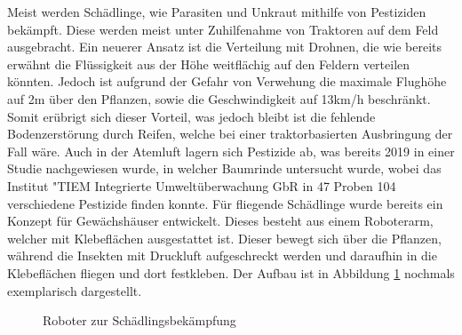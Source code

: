 Meist werden Schädlinge, wie Parasiten und Unkraut mithilfe von Pestiziden
bekämpft. Diese werden meist unter Zuhilfenahme von Traktoren auf dem Feld
ausgebracht. Ein neuerer Ansatz ist die Verteilung mit Drohnen, die wie bereits
erwähnt die Flüssigkeit aus der Höhe weitflächig auf den Feldern verteilen
könnten. Jedoch ist aufgrund der Gefahr von Verwehung die maximale Flughöhe auf
2m über den Pflanzen, sowie die Geschwindigkeit auf 13km/h
beschränkt.\cite{bvl} Somit erübrigt sich dieser Vorteil, was jedoch bleibt ist
die fehlende Bodenzerstörung durch Reifen, welche bei einer traktorbasierten
Ausbringung der Fall wäre. Auch in der Atemluft lagern sich Pestizide ab, was
bereits 2019 in einer Studie nachgewiesen wurde, in welcher Baumrinde
untersucht wurde, wobei das Institut "TIEM Integrierte Umweltüberwachung GbR in
47 Proben 104 verschiedene Pestizide finden
konnte.\cite{clausing2020baumrinden} Für fliegende Schädlinge wurde bereits ein
Konzept für Gewächshäuser entwickelt. Dieses besteht aus einem Roboterarm,
welcher mit Klebeflächen ausgestattet ist. Dieser bewegt sich über die
Pflanzen, während die Insekten mit Druckluft aufgeschreckt werden und daraufhin
in die Klebeflächen fliegen und dort festkleben. Der Aufbau ist in Abbildung
\ref{fig:schaedlingsbekaempfung} nochmals exemplarisch dargestellt.\cite{hoing2020entwicklung}

\begin{figure}[!h]
    \centering
    
    \caption{Roboter zur Schädlingsbekämpfung}
    \label{fig:schaedlingsbekaempfung}
\end{figure}

